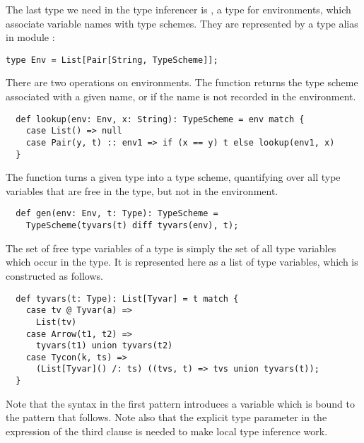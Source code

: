 \documentclass[a4paper,12pt,twoside,titlepage]{book}
\begin{document}
{The last type we need in the type inferencer is
, a type for environments, which associate variable names
with type schemes. They are represented by a type alias  in
module :
\begin{lstlisting}
type Env = List[Pair[String, TypeScheme]];
\end{lstlisting}
There are two operations on environments. The  function
returns the type scheme associated with a given name, or 
if the name is not recorded in the environment.
\begin{lstlisting}
  def lookup(env: Env, x: String): TypeScheme = env match {
    case List() => null
    case Pair(y, t) :: env1 => if (x == y) t else lookup(env1, x)
  }
\end{lstlisting}
The  function turns a given type into a type scheme,
quantifying over all type variables that are free in the type, but
not in the environment.
\begin{lstlisting}
  def gen(env: Env, t: Type): TypeScheme = 
    TypeScheme(tyvars(t) diff tyvars(env), t);
\end{lstlisting}
The set of free type variables of a type is simply the set of all type
variables which occur in the type. It is represented here as a list of
type variables, which is constructed as follows.
\begin{lstlisting}
  def tyvars(t: Type): List[Tyvar] = t match {
    case tv @ Tyvar(a) => 
      List(tv)
    case Arrow(t1, t2) => 
      tyvars(t1) union tyvars(t2)
    case Tycon(k, ts) => 
      (List[Tyvar]() /: ts) ((tvs, t) => tvs union tyvars(t));
  }
\end{lstlisting}
Note that the syntax  in the first pattern introduces a variable
which is bound to the pattern that follows. Note also that the explicit type parameter \code{[Tyvar]} in the expression of the third
clause is needed to make local type inference work.

}
\end{document}
